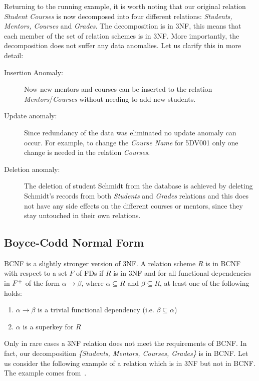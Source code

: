 Returning to the running example, it is worth noting that our original relation \textit{Student Courses} is now decomposed
into four different relations: \textit{Students, Mentors, Courses} and \textit{Grades}. The 
decomposition is in 3NF, this means that each member of the set of relation schemes is in 3NF. 
More importantly, the decomposition does not suffer any data anomalies. 
Let us clarify this in more detail:
\begin{description}
  \item[Insertion Anomaly:] Now new mentors and courses can be inserted to the relation \textit{Mentors}/\textit{Courses} without needing to add new students.
  \item[Update anomaly:] Since redundancy of the data was eliminated no update anomaly can occur. For example, to change the \textit{Course Name} for 5DV001 only one change is needed in the relation \textit{Courses}.
  \item[Deletion anomaly:]  The deletion of student Schmidt from the database is achieved by deleting Schmidt's records from both \textit{Students} and \textit{Grades} relations and this does not have any side effects on the different courses or mentors, since they stay untouched in their own relations.  
\end{description}

\subsection{Boyce-Codd Normal Form}
\label{sec:BCNF}
BCNF is a slightly stronger version of 3NF. A relation scheme $R$ is in BCNF 
with respect to a set $F$ of FDs if $R$ is in 3NF and for all functional dependencies in $F\sp{+}$ 
of the form $\alpha \rightarrow \beta$, where $\alpha \subseteq R$ and $\beta \subseteq R$,
at least one of the following holds:
\begin{enumerate}
  \item $\alpha \rightarrow \beta$ is a trivial functional dependency (i.e. $\beta \subseteq \alpha$)
  \item $\alpha$ is a superkey for $R$ 
\end{enumerate}

Only in rare cases a 3NF relation does not meet the requirements of BCNF. In fact, our decomposition 
\textit{\{Students, Mentors, Courses, Grades\}} is in BCNF. Let us consider the following
example of a relation which is in 3NF but not in BCNF.  The example 
comes from~\cite[Section 6.5.3]{bdb2}.

